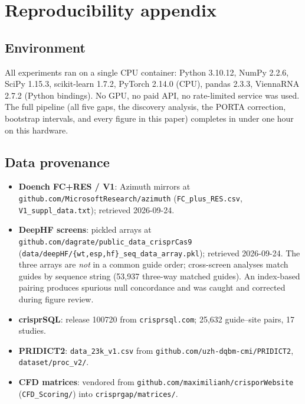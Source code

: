 \appendix
\section{Reproducibility appendix}
\label{sec:repro}

\subsection{Environment}
All experiments ran on a single CPU container: Python 3.10.12,
NumPy 2.2.6, SciPy 1.15.3, scikit-learn 1.7.2, PyTorch 2.14.0 (CPU),
pandas 2.3.3, ViennaRNA 2.7.2 (Python bindings). No GPU, no paid API, no
rate-limited service was used. The full pipeline (all five gaps, the
discovery analysis, the PORTA correction, bootstrap intervals, and every
figure in this paper) completes in under one hour on this hardware.

\subsection{Data provenance}
\begin{itemize}
\item \textbf{Doench FC+RES / V1}: Azimuth mirrors at
\texttt{github.com/MicrosoftResearch/azimuth} (\texttt{FC\_plus\_RES.csv},
\texttt{V1\_suppl\_data.txt}); retrieved 2026-09-24.
\item \textbf{DeepHF screens}: pickled arrays at
\texttt{github.com/dagrate/public\_data\_crisprCas9}
(\texttt{data/deepHF/\{wt,esp,hf\}\_seq\_data\_array.pkl}); retrieved
2026-09-24. The three arrays are \emph{not} in a common guide order;
cross-screen analyses match guides by sequence string (53{,}937 three-way
matched guides). An index-based pairing produces spurious null concordance and
was caught and corrected during figure review.
\item \textbf{crisprSQL}: release 100720 from \texttt{crisprsql.com};
25{,}632 guide--site pairs, 17 studies.
\item \textbf{PRIDICT2}: \texttt{data\_23k\_v1.csv} from
\texttt{github.com/uzh-dqbm-cmi/PRIDICT2}, \texttt{dataset/proc\_v2/}.
\item \textbf{CFD matrices}: vendored from
\texttt{github.com/maximilianh/crisporWebsite} (\texttt{CFD\_Scoring/})
into \texttt{crisprgap/matrices/}.
\end{itemize}

